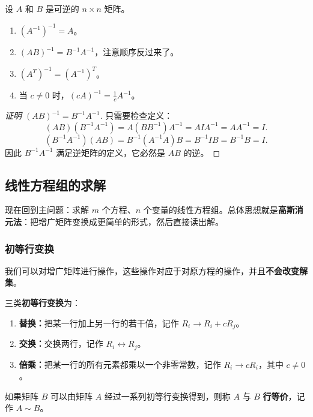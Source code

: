 \begin{property}[逆矩阵的性质]
设 $A$ 和 $B$ 是可逆的 $n\times n$ 矩阵。
\begin{enumerate}
    \item $(A^{-1})^{-1}=A$。
    \item $(AB)^{-1}=B^{-1}A^{-1}$，注意顺序反过来了。
    \item $(A^T)^{-1}=(A^{-1})^T$。
    \item 当 $c\neq0$ 时，$(cA)^{-1}=\frac{1}{c}A^{-1}$。
\end{enumerate}
\end{property}
\begin{proof}[证明 $(AB)^{-1}=B^{-1}A^{-1}$]
只需要检查定义：
\[ (AB)(B^{-1}A^{-1})=A(BB^{-1})A^{-1}=AIA^{-1}=AA^{-1}=I. \]
\[ (B^{-1}A^{-1})(AB)=B^{-1}(A^{-1}A)B=B^{-1}IB=B^{-1}B=I. \]
因此 $B^{-1}A^{-1}$ 满足逆矩阵的定义，它必然是 $AB$ 的逆。
\end{proof}

\subsection{线性方程组的求解}

现在回到主问题：求解 $m$ 个方程、$n$ 个变量的线性方程组。总体思想就是\textbf{高斯消元法}：把增广矩阵变换成更简单的形式，然后直接读出解。

\subsubsection{初等行变换}

我们可以对增广矩阵进行操作，这些操作对应于对原方程的操作，并且\textbf{不会改变解集}。

\begin{definition}
三类\textbf{初等行变换}为：
\begin{enumerate}
    \item \textbf{替换：}把某一行加上另一行的若干倍，记作 $R_i\to R_i+cR_j$。
    \item \textbf{交换：}交换两行，记作 $R_i\leftrightarrow R_j$。
    \item \textbf{倍乘：}把某一行的所有元素都乘以一个非零常数，记作 $R_i\to cR_i$，其中 $c\neq0$。
\end{enumerate}
\end{definition}

\begin{definition}
如果矩阵 $B$ 可以由矩阵 $A$ 经过一系列初等行变换得到，则称 $A$ 与 $B$ \textbf{行等价}，记作 $A\sim B$。
\end{definition}

